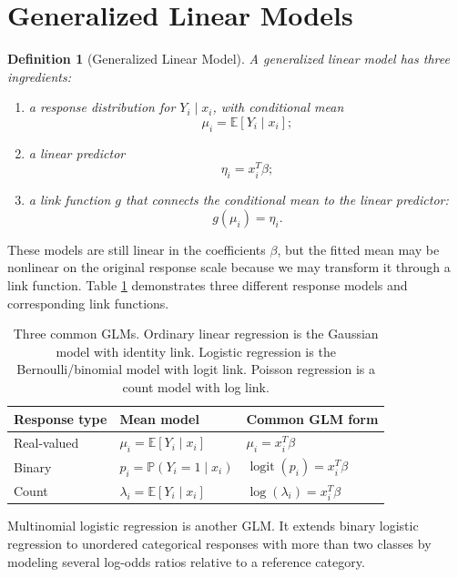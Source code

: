 \documentclass[twoside]{article}
\newtheorem{definition}[theorem]{Definition}
\theoremstyle{definition}
\renewcommand{\P}{\mathbb{P}}
\newcommand{\E}{\mathbb{E}}
\newcommand{\logit}{\operatorname{logit}}
\begin{document}
\section{Generalized Linear Models}

\begin{definition}[Generalized Linear Model]
A generalized linear model has three ingredients:
\begin{enumerate}
    \item a response distribution for $Y_i \mid x_i$, with conditional mean
    \[
        \mu_i = \E[Y_i \mid x_i];
    \]
    \item a linear predictor
    \[
        \eta_i = x_i^T\beta;
    \]
    \item a link function $g$ that connects the conditional mean to the linear predictor:
    \[
        g(\mu_i) = \eta_i.
    \]
\end{enumerate}
\end{definition}

These models are still linear in the coefficients $\beta$, but the fitted mean may be nonlinear on the original response scale because we may transform it through a link function. Table \ref{tab:glm-families} demonstrates three different response models and corresponding link functions.

\begin{table}[H]
    \centering
    \begin{tabular}{lll}
        \toprule
        Response type & Mean model & Common GLM form \\
        \midrule
        Real-valued & $\mu_i = \E[Y_i \mid x_i]$ & $\mu_i = x_i^T\beta$ \\
        Binary & $p_i = \P(Y_i = 1 \mid x_i)$ & $\logit(p_i) = x_i^T\beta$ \\
        Count & $\lambda_i = \E[Y_i \mid x_i]$ & $\log(\lambda_i) = x_i^T\beta$ \\
        \bottomrule
\end{tabular}
    \caption{Three common GLMs. Ordinary linear regression is the Gaussian model with identity link. Logistic regression is the Bernoulli/binomial model with logit link. Poisson regression is a count model with log link.}
    \label{tab:glm-families}
\end{table}

Multinomial logistic regression is another GLM. It extends binary logistic regression to unordered categorical responses with more than two classes by modeling several log-odds ratios relative to a reference category.
\end{document}
